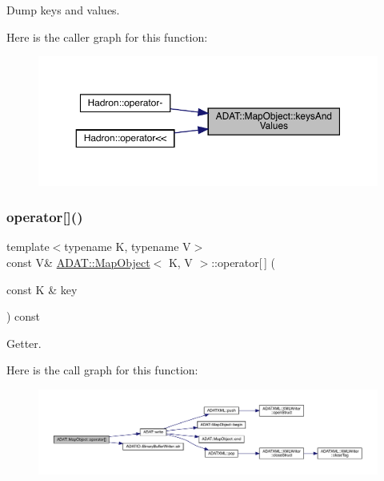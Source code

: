 Dump keys and values. 

Here is the caller graph for this function\+:\nopagebreak
\begin{figure}[H]
\begin{center}
\leavevmode
\includegraphics[width=350pt]{da/d29/classADAT_1_1MapObject_ab19c1622f3edfd0755e42583e6a48844_icgraph}
\end{center}
\end{figure}
\mbox{\label{classADAT_1_1MapObject_adb014dc7d3ef80a73fd1734e818eeef4}} 
\subsubsection{\texorpdfstring{operator[]()}{operator[]()}\hspace{0.1cm}{\footnotesize\ttfamily [1/4]}}
{\footnotesize\ttfamily template$<$typename K, typename V$>$ \\
const V\& \mbox{\hyperlink{classADAT_1_1MapObject}{A\+D\+A\+T\+::\+Map\+Object}}$<$ K, V $>$\+::operator\mbox{[}$\,$\mbox{]} (\begin{DoxyParamCaption}\item[{const K \&}]{key }\end{DoxyParamCaption}) const\hspace{0.3cm}{\ttfamily [inline]}}



Getter. 

Here is the call graph for this function\+:
\nopagebreak
\begin{figure}[H]
\begin{center}
\leavevmode
\includegraphics[width=350pt]{da/d29/classADAT_1_1MapObject_adb014dc7d3ef80a73fd1734e818eeef4_cgraph}
\end{center}
\end{figure}
\mbox{\label{classADAT_1_1MapObject_adb014dc7d3ef80a73fd1734e818eeef4}} 
